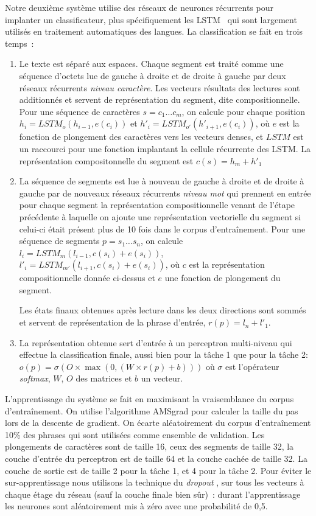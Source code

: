 Notre deuxième système utilise des réseaux de neurones récurrents pour implanter un classificateur, plus spécifiquement les LSTM~\cite{hochreiter1997long} qui sont largement utilisés en traitement automatiques des langues.
La classification se fait en trois temps~:
\begin{enumerate}
\item Le texte est séparé aux espaces.
  Chaque segment est traité comme une séquence d'octets lue de gauche à droite et de droite à gauche par deux réseaux récurrents \emph{niveau caractère}.
  Les vecteurs résultats des lectures sont additionnés et servent de représentation du segment, dite compositionnelle.
  Pour une séquence de caractères $s = c_{1}\ldots c_{m}$, on calcule pour chaque position $h_{i} = LSTM_{o}(h_{i-1},e(c_{i}))$ et $h'_{i} = LSTM_{o'}(h'_{i+1},e(c_{i}))$, où $e$ est la fonction de plongement des caractères vers les vecteurs denses, et $LSTM$ est un raccourci pour une fonction  implantant la cellule récurrente des LSTM.
  La représentation compositonnelle du segment est $c(s) = h_{m} + h'_{1}$

\item La séquence de segments est lue à nouveau de gauche à droite et de droite à gauche par de nouveaux réseaux récurrents \emph{niveau mot} qui prennent en entrée pour chaque segment la représentation compositionnelle venant de l'étape précédente à laquelle on ajoute une représentation vectorielle du segment si celui-ci était présent  plus de 10 fois dans le corpus d'entraînement.
  Pour une séquence de segments $p = s_{1} \ldots s_{n}$, on calcule
  $l_{i} = LSTM_{m}(l_{i-1},c(s_{i}) + e(s_{i}))$, $l'_{i} =
  LSTM_{m'}(l_{i+1},c(s_{i}) + e(s_{i}))$, où $c$ est la représentation compositionnelle donnée ci-dessus et $e$ une fonction de plongement du segment.

  Les états finaux obtenues après lecture dans les deux directions sont sommés et servent de représentation de la phrase d'entrée, $r(p) = l_{n} + l'_{1}$.

\item La représentation obtenue sert d'entrée à un perceptron multi-niveau qui effectue la classification finale, aussi bien pour la tâche 1 que pour la tâche 2:  $o(p) = \sigma(O \times \max(0, (W \times r(p) + b)))$ où $\sigma$ est l'opérateur \emph{softmax}, $W$, $O$ des matrices et $b$ un vecteur.
\end{enumerate}

L'apprentissage du système se fait en maximisant la vraisemblance du corpus d'entraînement.
On utilise l'algorithme AMSgrad pour  calculer la taille du pas lors de la descente de gradient.
On écarte aléatoirement du corpus d'entraînement 10\% des phrases qui sont utilisées comme ensemble de validation.
Les plongements de caractères sont de taille 16, ceux des segments de taille 32, la couche d'entrée du perceptron est de taille 64 et la couche cachée de taille 32.
La couche de sortie est de taille 2 pour la tâche 1, et 4 pour la tâche 2.
Pour éviter le sur-apprentissage nous utilisons la technique du \emph{dropout} \cite{srivastava2014dropout}, sur tous les vecteurs à chaque étage du réseau (sauf la couche finale bien sûr)~: durant l'apprentissage les neurones sont aléatoirement mis à zéro avec une probabilité de 0,5.


